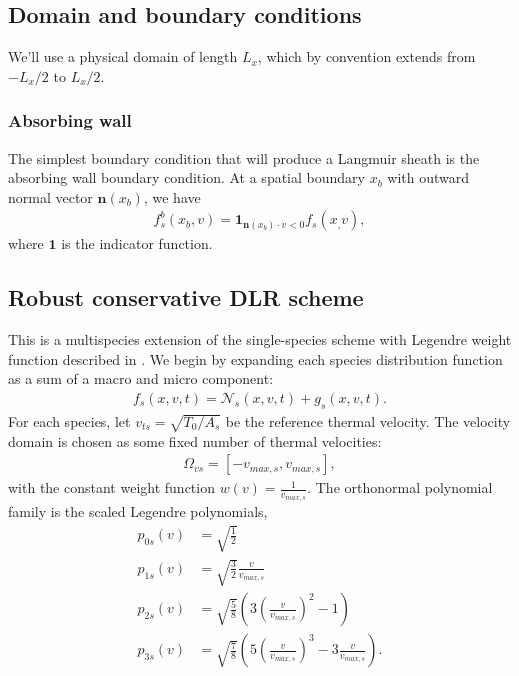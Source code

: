 \documentclass{article}
\begin{document}
\subsection{Domain and boundary conditions}

We'll use a physical domain of length $L_x$, which by convention extends from $-L_x/2$ to $L_x/2$.

\subsubsection{Absorbing wall}
The simplest boundary condition that will produce a Langmuir sheath is the absorbing wall
boundary condition. At a spatial boundary $x_b$ with outward normal vector $\mathbf{n}(x_b)$, we have
\begin{align}
    f_s^b(x_b, v) = \mathbf{1}_{\mathbf{n}(x_b) \cdot v < 0} f_s(x_, v),
\end{align}
where $\mathbf{1}$ is the indicator function.

\subsection{Robust conservative DLR scheme}

This is a multispecies extension of the single-species scheme with Legendre weight function 
described in \cite{coughlinRobustConservativeDynamical2024}.
We begin by expanding each species distribution function as a sum of a macro and micro component:
\begin{align*}
f_s(x, v, t) = \mathcal{N}_s(x, v, t) + g_s(x, v, t).
\end{align*}
For each species, let $v_{ts} = \sqrt{T_0 / A_s}$ be the reference thermal velocity.
The velocity domain is chosen as some fixed number of thermal velocities:
\begin{align*}
    \Omega_{vs} = [-v_{max,s}, v_{max,s}],
\end{align*}
with the constant weight function $w(v) = \frac{1}{v_{max,s}}$.
The orthonormal polynomial family is the scaled Legendre polynomials,
\begin{align*}
    p_{0s}(v) &= \sqrt{\frac{1}{2}} \\
    p_{1s}(v) &= \sqrt{\frac{3}{2}} \frac{v}{v_{max,s}} \\
    p_{2s}(v) &= \sqrt{\frac{5}{8}} \left( 3 \left( \frac{v}{v_{max,s}} \right)^2 - 1 \right)  \\
    p_{3s}(v) &= \sqrt{\frac{7}{8}} \left( 5 \left( \frac{v}{v_{max,s}} \right)^3 - 3 \frac{v}{v_{max,s}} \right). 
\end{align*}
\end{document}
